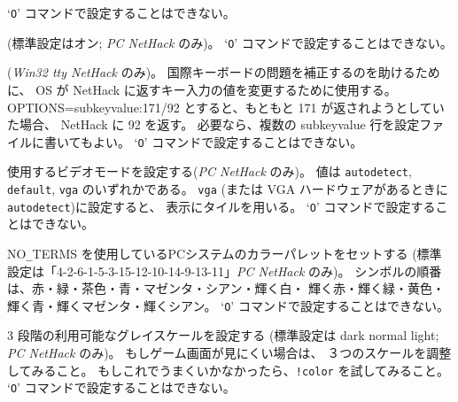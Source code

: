 `{\tt O}' コマンドで設定することはできない。
\item[\ib{soundcard}]
(標準設定はオン; {\it PC NetHack \/} のみ)。
`{\tt O}' コマンドで設定することはできない。
\item[\ib{subkeyvalue}]
({\it Win32 tty NetHack \/} のみ)。
国際キーボードの問題を補正するのを助けるために、
OS が NetHack に返すキー入力の値を変更するために使用する。
OPTIONS=subkeyvalue:171/92
とすると、もともと 171 が返されようとしていた場合、
NetHack に 92 を返す。
必要なら、複数の subkeyvalue 行を設定ファイルに書いてもよい。
`{\tt O}' コマンドで設定することはできない。
\item[\ib{video}]
使用するビデオモードを設定する({\it PC\/ NetHack\/} のみ)。
値は {\tt autodetect\/}, {\tt default\/}, {\tt vga\/} のいずれかである。
{\tt vga\/} (または VGA ハードウェアがあるときに{\tt autodetect\/})に設定すると、
表示にタイルを用いる。
`{\tt O}' コマンドで設定することはできない。
\item[\ib{videocolors}]
\begin{sloppypar}
NO\verb+_+TERMS を使用しているPCシステムのカラーパレットをセットする
(標準設定は「4-2-6-1-5-3-15-12-10-14-9-13-11」{\it PC\/ NetHack\/} のみ)。
シンボルの順番は、赤・緑・茶色・青・マゼンタ・シアン・輝く白・
輝く赤・輝く緑・黄色・輝く青・輝くマゼンタ・輝くシアン。
`{\tt O}' コマンドで設定することはできない。
\end{sloppypar}
\item[\ib{videoshades}]
3 段階の利用可能なグレイスケールを設定する
(標準設定は dark normal light; {\it PC\/ NetHack\/} のみ)。
もしゲーム画面が見にくい場合は、
３つのスケールを調整してみること。
もしこれでうまくいかなかったら、{\tt !color} を試してみること。
`{\tt O}' コマンドで設定することはできない。
\elist

